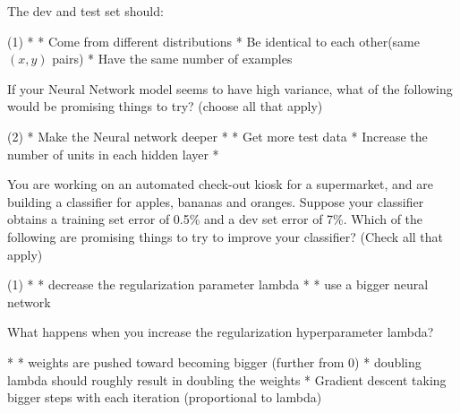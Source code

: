 \documentclass[11pt]{extarticle}
\begin{document}
\begin{exercise}
    The dev and test set should:
    \begin{choice}(1)
        * 
        * Come from different distributions
        * Be identical to each other(same \((x,y)\) pairs)
        * Have the same number of examples
    \end{choice}
\end{exercise}
\begin{solution}
\end{solution}

\begin{exercise}
    If your Neural Network model seems to have high variance, what of the following would be promising things to try? (choose all that apply)
    \begin{choice} (2)
        * Make the Neural network deeper
        * 
        * Get more test data
        * Increase the number of units in each hidden layer
        * 
    \end{choice}
\end{exercise}
\begin{solution}
\end{solution}

\begin{exercise}
    You are working on an automated check-out kiosk for a supermarket, and are building a classifier for apples, bananas and oranges. Suppose your classifier obtains a training set error of 0.5\% and a dev set error of 7\%. Which of the following are promising things to try to improve your classifier? (Check all that apply)
    \begin{choice}(1)
        * 
        * decrease the regularization parameter lambda
        * 
        * use a bigger neural network
    \end{choice}
\end{exercise}
\begin{solution}
\end{solution}

\begin{exercise}
    What happens when you increase the regularization hyperparameter lambda?
    \begin{choice}
        * 
        * weights are pushed toward becoming bigger (further from 0)
        * doubling lambda should roughly result in doubling the weights
        * Gradient descent taking bigger steps with each iteration (proportional to lambda)
    \end{choice}
\end{exercise}
\begin{solution}
\end{solution}
\end{document}
